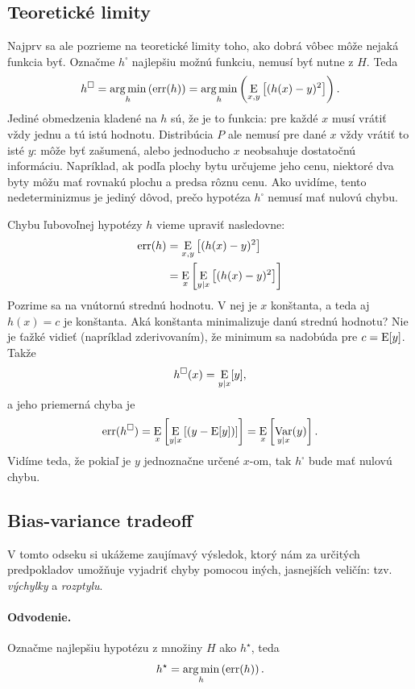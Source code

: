\subsection{Teoretické limity}
Najprv sa ale pozrieme na teoretické limity toho, ako dobrá vôbec
môže nejaká funkcia byť. Označme $h^{\square}$ najlepšiu možnú funkciu,
nemusí byť nutne z $H$. Teda
$$h^{\square} = \operatorname*{arg\,min}_h \left( \mathrm{err}(h) \right) = \operatorname*{arg\,min}_h \left( \operatorname*{\mathrm{E}}_{x,y} \left[ (h(x) - y)^2 \right] \right).$$
Jediné obmedzenia kladené na $h$ sú, že je to funkcia: pre každé $x$
musí vrátiť vždy jednu a tú istú hodnotu. Distribúcia $P$ ale nemusí
pre dané $x$ vždy vrátiť to isté $y$: môže byť zašumená, alebo
jednoducho $x$ neobsahuje dostatočnú informáciu. Napríklad, ak podľa
plochy bytu určujeme jeho cenu, niektoré dva byty môžu mať rovnakú
plochu a predsa rôznu cenu. Ako uvidíme, tento nedeterminizmus je
jediný dôvod, prečo hypotéza $h^{\square}$ nemusí mať nulovú chybu.

Chybu ľubovoľnej hypotézy $h$ vieme upraviť nasledovne:
\begin{align}
  \mathrm{err}(h)
    &= \operatorname*{\mathrm{E}}_{x,y} \left[ (h(x) - y)^2 \right] \\
    &= \operatorname*{\mathrm{E}}_{x} \left[ \operatorname*{\mathrm{E}}_{y|x} \left[ (h(x) - y)^2 \right] \right]
\end{align}
Pozrime sa na vnútornú strednú hodnotu. V nej je $x$ konštanta, a
teda aj $h(x) = c$ je konštanta. Aká konštanta minimalizuje danú
strednú hodnotu? Nie je ťažké vidieť (napríklad zderivovaním), že
minimum sa nadobúda pre $c = \operatorname*{\mathrm{E}}[y]$. Takže
$$h^{\square}(x) = \operatorname*{\mathrm{E}}_{y|x}[y],$$
a jeho priemerná chyba je
$$\mathrm{err}(h^{\square}) = \operatorname*{\mathrm{E}}_{x} \left[ \operatorname*{\mathrm{E}}_{y|x} \left[ (y - \operatorname*{\mathrm{E}}[y]) \right] \right] = \operatorname*{\mathrm{E}}_{x} \left[ \operatorname*{\mathrm{Var}}_{y|x}(y) \right].$$
Vidíme teda, že pokiaľ je $y$ jednoznačne určené $x$-om, tak
$h^{\square}$ bude mať nulovú chybu.



\subsection{Bias-variance tradeoff}
V tomto odseku si ukážeme zaujímavý výsledok, ktorý nám za určitých
predpokladov umožňuje vyjadriť chyby pomocou iných, jasnejších veličín:
tzv. \emph{výchylky} a \emph{rozptylu}.


\paragraph{Odvodenie.}
Označme najlepšiu hypotézu z množiny $H$ ako $h^\star$, teda
$$h^\star = \operatorname*{arg\,min}_h \left( \mathrm{err}(h) \right).$$


